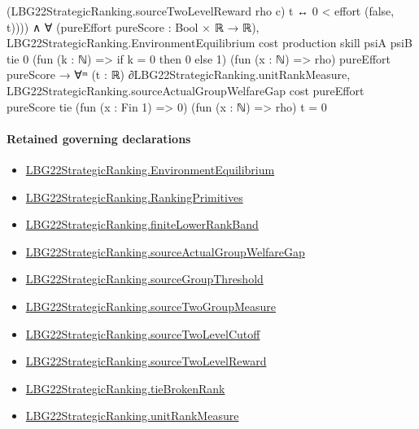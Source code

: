 \documentclass[10pt]{article}
\begin{document}
\begin{ReviewVerbatim}
                                        (LBG22StrategicRanking.sourceTwoLevelReward rho c) t ↔
                                    0 < effort (false, t)))) ∧
                            ∀ (pureEffort pureScore : Bool × ℝ → ℝ),
                              LBG22StrategicRanking.EnvironmentEquilibrium cost production skill psiA psiB tie 0
                                  (fun (k : ℕ) => if k = 0 then 0 else 1) (fun (x : ℕ) => rho) pureEffort pureScore →
                                ∀ᵐ (t : ℝ) ∂LBG22StrategicRanking.unitRankMeasure,
                                  LBG22StrategicRanking.sourceActualGroupWelfareGap cost pureEffort pureScore tie
                                      (fun (x : Fin 1) => 0) (fun (x : ℕ) => rho) t =
                                    0
\end{ReviewVerbatim}

\paragraph{Retained governing declarations}
\begin{itemize}\raggedright
\item \hyperlink{paper-prerequisite-b8e06f39e94d0049}{LBG22\allowbreak{}Strategic\allowbreak{}Ranking.\allowbreak{}Environment\allowbreak{}Equilibrium}
\item \hyperlink{paper-prerequisite-9bbcc12f4a1736bf}{LBG22\allowbreak{}Strategic\allowbreak{}Ranking.\allowbreak{}Ranking\allowbreak{}Primitives}
\item \hyperlink{paper-prerequisite-a42f440ddc254fa7}{LBG22\allowbreak{}Strategic\allowbreak{}Ranking.\allowbreak{}finite\allowbreak{}Lower\allowbreak{}Rank\allowbreak{}Band}
\item \hyperlink{paper-prerequisite-d3e90f3908818ca5}{LBG22\allowbreak{}Strategic\allowbreak{}Ranking.\allowbreak{}source\allowbreak{}Actual\allowbreak{}Group\allowbreak{}Welfare\allowbreak{}Gap}
\item \hyperlink{paper-prerequisite-b2f8283910c81320}{LBG22\allowbreak{}Strategic\allowbreak{}Ranking.\allowbreak{}source\allowbreak{}Group\allowbreak{}Threshold}
\item \hyperlink{paper-prerequisite-5b3be494cde30a37}{LBG22\allowbreak{}Strategic\allowbreak{}Ranking.\allowbreak{}source\allowbreak{}Two\allowbreak{}Group\allowbreak{}Measure}
\item \hyperlink{paper-prerequisite-f88aac58507e44ca}{LBG22\allowbreak{}Strategic\allowbreak{}Ranking.\allowbreak{}source\allowbreak{}Two\allowbreak{}Level\allowbreak{}Cutoff}
\item \hyperlink{paper-prerequisite-30d97cd43eb79017}{LBG22\allowbreak{}Strategic\allowbreak{}Ranking.\allowbreak{}source\allowbreak{}Two\allowbreak{}Level\allowbreak{}Reward}
\item \hyperlink{paper-prerequisite-b7c71e53177b76c6}{LBG22\allowbreak{}Strategic\allowbreak{}Ranking.\allowbreak{}tie\allowbreak{}Broken\allowbreak{}Rank}
\item \hyperlink{governing-declaration-678cf48d549cb620}{LBG22\allowbreak{}Strategic\allowbreak{}Ranking.\allowbreak{}unit\allowbreak{}Rank\allowbreak{}Measure}
\end{itemize}
\end{document}
